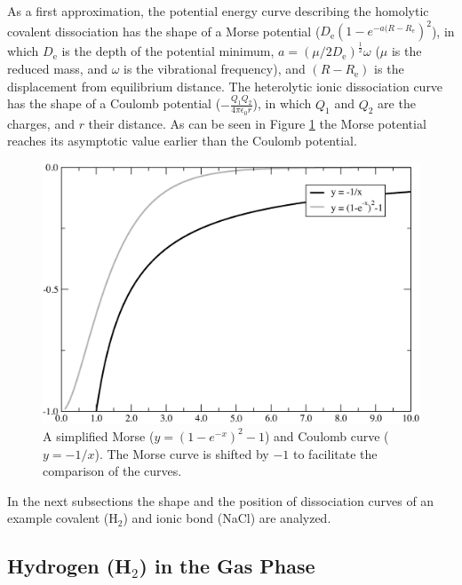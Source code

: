 As a first approximation, the potential energy curve describing the homolytic covalent dissociation has the shape of a Morse potential \mbox{($D_{\mathrm{e}}(1-e^{-a(R-R_{\mathrm{e}}})^{2}$)}, in which $D_{\mathrm{e}}$ is the depth of the potential minimum, $a=(\mu/2D_{\mathrm{e}})^{\frac{1}{2}}\omega$ ($\mu$ is the reduced mass, and $\omega$ is the vibrational frequency), and $(R-R_{\mathrm{e}})$ is the displacement from equilibrium distance.  The heterolytic ionic dissociation curve has the shape of a Coulomb potential ($-\frac{Q_1Q_2}{4\pi\epsilon_{\mathrm{0}}r}$), in which $Q_1$ and $Q_2$ are the charges, and $r$ their distance.  As can be seen in Figure \ref{ch3.fig.m_vs_c} the Morse potential reaches its asymptotic value earlier than the Coulomb potential.
\begin{figure}[htbp]
\center
\includegraphics[scale=0.62]{dissociation/figures/m_vs_c.eps}
\caption{A simplified Morse ($y=(1-e^{-x})^2-1$) and Coulomb curve ($y=-1/x$). The Morse curve is shifted by $-1$ to facilitate the comparison of the curves. }
\label{ch3.fig.m_vs_c}
\end{figure}
In the next subsections the shape and the position of dissociation curves of an example covalent (H$_2$) and ionic bond (NaCl) are analyzed. 

\subsection{Hydrogen (H$_2$) in the Gas Phase}

